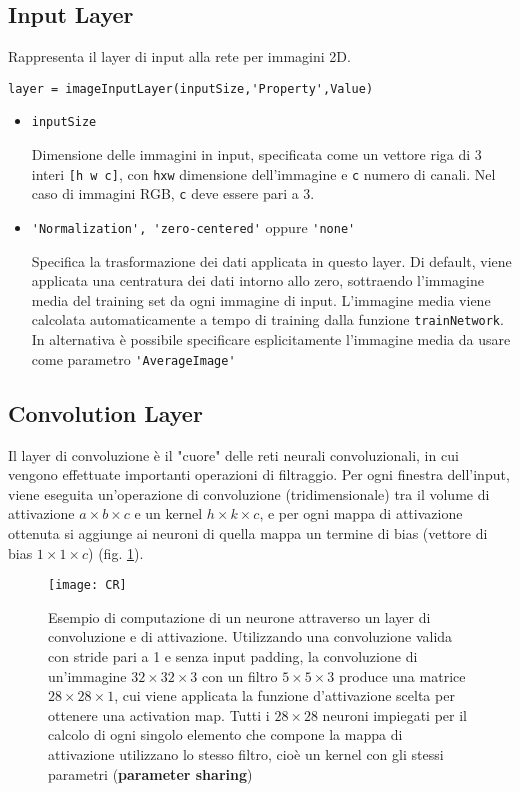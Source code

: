 \subsection{Input Layer}
\label{INPUT}
Rappresenta il layer di input alla rete per immagini 2D.
\begin{verbatim}
layer = imageInputLayer(inputSize,'Property',Value)
\end{verbatim}
\begin{itemize}
	\item \verb|inputSize| 
	
	Dimensione delle immagini in input, specificata come un vettore riga di 3 interi \verb|[h w c]|, con \verb|hxw| dimensione dell'immagine e \verb|c| numero di canali. Nel caso di immagini RGB, \verb|c| deve essere pari a 3.
	
	\item \verb|'Normalization', 'zero-centered'| oppure \verb|'none'|
	
	Specifica la trasformazione dei dati applicata in questo layer. Di default, viene applicata una centratura dei dati intorno allo zero, sottraendo l'immagine media del training set da ogni immagine di input. L'immagine media viene calcolata automaticamente a tempo di training dalla funzione \verb|trainNetwork|. In alternativa è possibile specificare esplicitamente l'immagine media da usare come parametro \verb|'AverageImage'| 
\end{itemize}

\subsection{Convolution Layer}
\label{CONV}
Il layer di convoluzione è il "cuore" delle reti neurali convoluzionali, in cui vengono effettuate importanti operazioni di filtraggio. Per ogni finestra dell'input, viene eseguita un'operazione di convoluzione (tridimensionale) tra il volume di attivazione $a\times b\times c$ e un kernel $h\times k\times c$, e per ogni mappa di attivazione ottenuta si aggiunge ai neuroni di quella mappa un termine di bias (vettore di bias $1\times 1\times c$) (fig. \ref{fig:cr}).

\begin{figure}[h]
	\centering
	\texttt{[image: CR]}
	\caption[Convolution layer in una rete neurale convoluzionale]{Esempio di computazione di un neurone attraverso un layer di convoluzione e di attivazione. Utilizzando una convoluzione valida con stride pari a 1 e senza input padding, la convoluzione di un'immagine $32\times32\times3$ con un filtro $5\times5\times3$ produce una matrice $28\times28\times1$, cui viene applicata la funzione d'attivazione scelta per ottenere una activation map. Tutti i $28\times28$ neuroni impiegati per il calcolo di ogni singolo elemento che compone la mappa di attivazione utilizzano lo stesso filtro, cioè un kernel con gli stessi parametri (\textbf{parameter sharing})}
	\label{fig:cr}
\end{figure}

